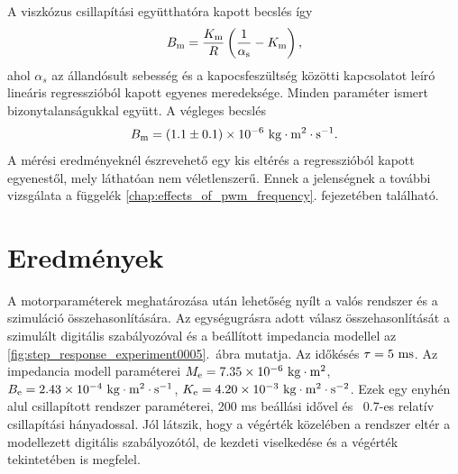 A viszkózus csillapítási együtthatóra kapott becslés így
\begin{equation}
    B_{\mathrm{m}} = \frac{K_{\mathrm{m}}}{R}\left(\frac{1}{\alpha_{\mathrm{s}}} - K_{\mathrm{m}}\right),
\end{equation}
ahol \(\alpha_s\) az állandósult sebesség és a kapocsfeszültség közötti kapcsolatot 
leíró lineáris regresszióból kapott egyenes meredeksége. Minden paraméter ismert bizonytalanságukkal 
együtt. A végleges becslés
\begin{equation}
    B_{\mathrm{m}} = (1.1 \pm 0.1)\times 10^{-6}~\mathrm{kg\cdot m^2\cdot s^{-1}}.
\end{equation}
A mérési eredményeknél észrevehető egy kis eltérés a regresszióból kapott egyenestől, mely láthatóan nem 
véletlenszerű. Ennek a jelenségnek a további vizsgálata a függelék \ref{chap:effects_of_pwm_frequency}. 
fejezetében található. 

\section{Eredmények}
A motorparaméterek meghatározása után lehetőség nyílt a valós rendszer és a szimuláció összehasonlítására.
Az egységugrásra adott válasz összehasonlítását a szimulált digitális szabályozóval és a beállított impedancia modellel 
az \ref{fig:step_response_experiment0005}.~ábra mutatja. Az időkésés \(\tau = 5~\mathrm{ms}\). Az impedancia modell paraméterei 
\(M_{\mathrm{e}} = 7.35 \times 10^{-6}~\mathrm{kg \cdot m^2}\), \(B_{\mathrm{e}} = 2.43 \times 10^{-4}~\mathrm{kg \cdot m^2 \cdot s^{-1}}\),
\(K_{\mathrm{e}} = 4.20 \times 10^{-3}~\mathrm{kg \cdot m^2 \cdot s^{-2}}\). Ezek egy enyhén alul csillapított rendszer paraméterei, 
200 ms beállási idővel és ~0.7-es relatív csillapítási hányadossal. Jól látszik, hogy a végérték közelében 
a rendszer eltér a modellezett digitális szabályozótól, de kezdeti viselkedése és a végérték tekintetében is megfelel.

